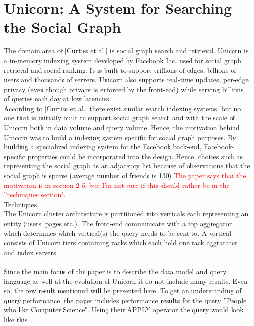 \documentclass{article}
\begin{document}
\section*{Unicorn: A System for Searching the Social Graph}

The domain area of [Curtiss et al.] is social graph search and retrieval. Unicorn is a in-memory indexing system developed by Facebook Inc. used for social graph retrieval and social ranking. It is built to support trillions of edges, billions of users and thousands of servers. Unicorn also supports real-time updates, per-edge privacy (even though privacy is enforced by the front-end) while serving billions of queries each day at low latencies.\\

\noindent According to [Curtiss et al.] there exist similar search indexing systems, but no one that is initially built to support social graph search and with the scale of Unicorn both in data volume and query volume. Hence, the motivation behind Unicorn was to build a indexing system specific for social graph purposes. By building a specialized indexing system for the Facebook back-end, Facebook-specific properties could be incorporated into the design. Hence, choices such as representing the social graph as an adjacency list because of observations that the social graph is sparse (average number of friends is 130) \textcolor{red}{The paper says that the motivation is in section 2-5, but I'm not sure if this should rather be in the ''techniques section"}.\\

\noindent Techniques\\ 
The Unicorn cluster architecture is partitioned into verticals each representing an entity (users, pages etc.). The front-end communicate with a top aggregator which determines which vertical(s) the query needs to be sent to. A vertical consists of Unicorn tiers containing racks which each hold one rack aggratator and index servers. \\


\noindent \\ Since the main focus of the paper is to describe the data model and query language as well at the evolution of Unicorn it do not include many results. Even so, the few result mentioned will be presented here. To get an understanding of query performance, the paper includes performance results for the query ''People who like Computer Science". Using their APPLY operator the query would look like this\\
\end{document}

